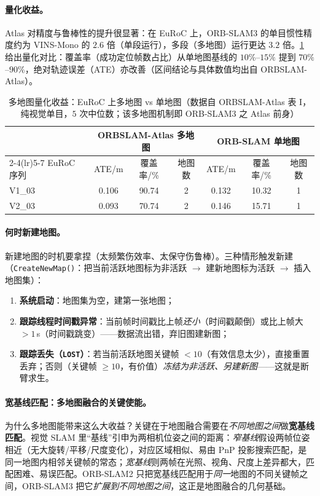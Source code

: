\paragraph{量化收益。}
Atlas 对精度与鲁棒性的提升很显著：在 EuRoC 上，ORB-SLAM3 的单目惯性精度约为 VINS-Mono 的 $2.6$ 倍（单段运行），多段（多地图）运行更达 $3.2$ 倍\cite{campos2021orbslam3}。\cref{tab:vio-multimap} 给出量化对比：覆盖率（成功定位帧数占比）从单地图基线的 $10\%$--$15\%$ 提到 $70\%$--$90\%$，绝对轨迹误差（ATE）亦改善（区间结论与具体数值均出自 ORBSLAM-Atlas\cite{elvira2019atlas}）。

\begin{table}[H]\centering\small
\caption{多地图量化收益：EuRoC 上多地图 vs 单地图（数据自 ORBSLAM-Atlas\cite{elvira2019atlas} 表 I，纯视觉单目，$5$ 次中位数；该多地图机制即 ORB-SLAM3 之 Atlas 前身）}
\label{tab:vio-multimap}
\begin{tabular}{lcccccc}
\toprule
& \multicolumn{3}{c}{ORBSLAM-Atlas 多地图} & \multicolumn{3}{c}{ORB-SLAM 单地图} \\
\cmidrule(lr){2-4}\cmidrule(lr){5-7}
EuRoC 序列 & ATE/m & 覆盖率/\% & 地图数 & ATE/m & 覆盖率/\% & 地图数 \\
\midrule
V1\_03 & 0.106 & 90.74 & 2 & 0.132 & 10.32 & 1 \\
V2\_03 & 0.093 & 70.74 & 2 & 0.146 & 15.71 & 1 \\
\bottomrule
\end{tabular}
\end{table}

\paragraph{何时新建地图。}
新建地图的时机要拿捏（太频繁伤效率、太保守伤鲁棒）\cite{campos2021orbslam3}。三种情形触发新建（\texttt{CreateNewMap()}：把当前活跃地图标为非活跃 $\to$ 建新地图标为活跃 $\to$ 插入地图集）：
\begin{enumerate}
  \item \textbf{系统启动}：地图集为空，建第一张地图；
  \item \textbf{跟踪线程时间戳异常}：当前帧时间戳比上帧\emph{还小}（时间戳颠倒）或比上帧大 $>1\,$s（时间戳跳变）——数据流出错，弃旧图建新图；
  \item \textbf{跟踪丢失（\texttt{LOST}）}：若当前活跃地图关键帧 $<10$（有效信息太少），直接重置丢弃；否则（关键帧 $\ge 10$，有价值）\emph{冻结为非活跃、另建新图}——这就是断臂求生。
\end{enumerate}

\paragraph{宽基线匹配：多地图融合的关键使能。}
为什么多地图能带来这么大收益？关键在于地图融合需要在\emph{不同地图之间}做\textbf{宽基线匹配}\cite{campos2021orbslam3}。视觉 SLAM 里“基线”引申为两相机位姿之间的距离：\emph{窄基线}假设两帧位姿相近（无大旋转/平移/尺度变化），对应区域相似、易由 PnP 投影搜索匹配，是同一地图内相邻关键帧的常态；\emph{宽基线}则两帧在光照、视角、尺度上差异都大，匹配困难、易误匹配。ORB-SLAM2 只把宽基线匹配用于\emph{同一}地图的不同关键帧之间，ORB-SLAM3 把它\emph{扩展到不同地图之间}，这正是地图融合的几何基础。

